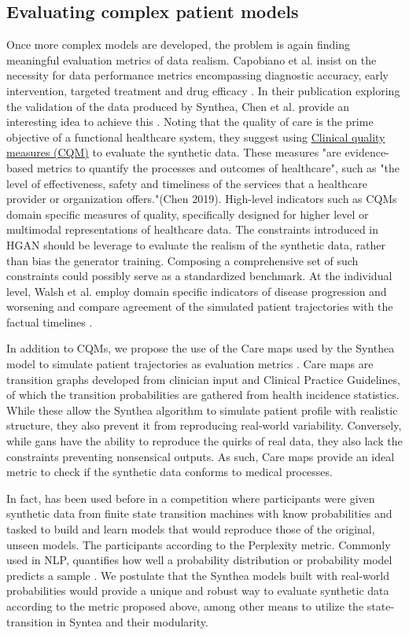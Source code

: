 \subsection{Evaluating complex patient models}
Once more complex models are developed, the problem is again finding meaningful evaluation metrics of data realism. Capobiano et al. insist on the necessity for data performance metrics encompassing diagnostic accuracy, early intervention, targeted treatment and drug efficacy \cite{Capobianco2020}. In their publication exploring the validation of the data produced by Synthea, Chen et al. provide an interesting idea to achieve this \cite{Chen_2019}. Noting that the quality of care is the prime objective of a functional healthcare system, they suggest using \hyperlink{CQM}{Clinical quality measures (CQM)} to evaluate the synthetic data. These measures "are evidence-based metrics to quantify the processes and outcomes of healthcare", such as "the level of effectiveness, safety and timeliness of the services that a healthcare provider or organization offers."(Chen 2019). High-level indicators such as \hypertarget{CQM}{CQMs} domain specific measures of quality, specifically designed for higher level or multimodal representations of healthcare data. The constraints introduced in HGAN should be leverage to evaluate the realism of the synthetic data, rather than bias the generator training. Composing a comprehensive set of such constraints could possibly serve as a standardized benchmark.
At the individual level, Walsh et al. employ domain specific indicators of disease progression and worsening and compare agreement of the simulated patient trajectories with the factual timelines \cite{walsh2020generating}.\par
In addition to \hypertarget{CQM}{CQMs}, we propose the use of the Care maps used by the Synthea model to simulate patient trajectories as evaluation metrics \cite{Walonoski_2017}. Care maps are transition graphs developed from clinician input and Clinical Practice Guidelines, of which the transition probabilities are gathered from health incidence statistics. While these allow the Synthea algorithm to simulate patient profile with realistic structure, they also prevent it from reproducing real-world variability. Conversely, while \glspl{gan} have the ability to reproduce the quirks of real data, they also lack the constraints preventing nonsensical outputs. As such, Care maps provide an ideal metric to check if the synthetic data conforms to medical processes.\par 
In fact, has been used before in a competition where participants were given synthetic data from finite state transition machines with know probabilities and tasked to build and learn models that would reproduce those of the original, unseen models. The participants according to the Perplexity metric. Commonly used in NLP, quantifies how well a probability distribution or probability model predicts a sample \cite{Verwer_2013}. We postulate that the Synthea models built with real-world probabilities would provide a unique and robust way to evaluate synthetic data according to the metric proposed above, among other means to utilize the state-transition in Syntea and their modularity.

